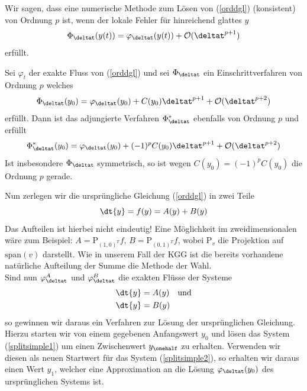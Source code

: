 \begin{mathdef}[Konsistenzordnung]
Wir sagen, dass eine numerische Methode zum Lösen von (\ref{orddgl}) (konsistent) von Ordnung $p$ ist, wenn der lokale Fehler für hinreichend glattes $y$
\[\Phi_{\deltat}(y(t))=\varphi_{\deltat}(y(t))+\mathcal{O}(\deltat^{p+1})\] erfüllt.
\end{mathdef}
\begin{maththeorem}
\label{adjfloworder}
Sei $\varphi_t$ der exakte Fluss von (\ref{orddgl}) und sei $\Phi_{\deltat}$ ein Einschrittverfahren von Ordnung $p$ welches 
\[\Phi_{\deltat}(y_0)=\varphi_{\deltat}(y_0)+C(y_0)\deltat^{p+1}+\mathcal{O}(\deltat^{p+2})\]
erfüllt. Dann ist das adjungierte Verfahren $\Phi_{\deltat}^*$ ebenfalls von Ordnung $p$ und erfüllt
\[\Phi_{\deltat}^*(y_0)=\varphi_{\deltat}(y_0)+(-1)^{p}C(y_0)\deltat^{p+1}+\mathcal{O}(\deltat^{p+2})\]
Ist insbesondere $\Phi_{\deltat}$ symmetrisch, so ist wegen $C(y_0)=(-1)^pC(y_0)$ die Ordnung $p$ gerade.
\end{maththeorem}
Nun zerlegen wir die ursprüngliche Gleichung (\ref{orddgl}) in zwei Teile
\[\dt{y}=f(y)=A(y)+B(y) \]
Das Aufteilen ist hierbei nicht eindeutig! Eine Möglichkeit im zweidimensionalen wäre zum Beispiel: $A=\text{P}_{(1,0)^T}f,\,B=\text{P}_{(0,1)^T}f$, wobei $\text{P}_v$ die Projektion auf $\text{span}(v)$ darstellt. Wie in unserem Fall der KGG ist die bereits vorhandene natürliche Aufteilung der Summe die Methode der Wahl.\\
Sind nun $\varphi_{\deltat}^A$ und $\varphi_{\deltat}^B$ die exakten Flüsse der Systeme
\begin{align}
\dt{y}&=A(y)\quad \text{und} \label{splitsimple1}\\ 
\dt{y}&=B(y) \label{splitsimple2}
\end{align}
so gewinnen wir daraus ein Verfahren zur Lösung der ursprünglichen Gleichung.\\
Hierzu starten wir von einem gegebenen Anfangswert $y_0$ und lösen das System (\ref{splitsimple1}) um einen Zwischenwert $y_{\onehalf}$ zu erhalten. Verwenden wir diesen als neuen Startwert für das System (\ref{splitsimple2}), so erhalten wir daraus einen Wert $y_1$, welcher eine Approximation an die Lösung $\varphi_{\deltat}(y_0)$ des ursprünglichen Systems ist.\\[1cm]
\noindent\begin{minipage}{0.3\textwidth}


\end{minipage}%
